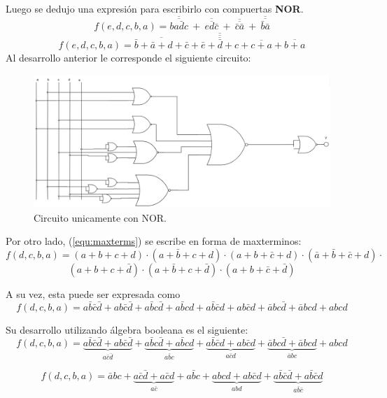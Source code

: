 \documentclass[a4paper]{article}
\begin{document}
\begin{center}
Luego se dedujo una expresión para escribirlo con compuertas \textbf{NOR}.
\[
	f \left( e,d,c,b,a \right) = \overline{\overline{b a \bar{d} c }} \ + \  \overline{\overline{ e d \bar{c}}} \ + \ \overline{\overline{\bar{c} \bar{a}}} \ + \ \overline{\overline{ \bar{b} \bar{a}}}
\]
\[
	f \left( e,d,c,b,a \right) =\overline{\overline{\overline{\bar{b}+\bar{a}+d+\bar{c}}+\overline{\bar{e}+\bar{d}+c}+\overline{c+a}+\overline{b+a}}}
\]
Al desarrollo anterior le corresponde el siguiente circuito:
\begin{figure}[H]
	\hspace*{-1cm}
	\centering
	\includegraphics[width=1.2\textwidth]{Circuito4.png}
	\caption{Circuito unicamente con NOR.}
	\label{fig:circ4}
\end{figure}

Por otro lado, (\ref{equ:maxterms}) se escribe en forma de maxterminos:
\[
	f \left( d,c,b,a \right) = \left( a + b + c + d \right) \cdot \left( a + \bar{b} + c + d\right) \cdot \left( a + b+ \bar{c} + d \right) \cdot \left( \bar{a} + \bar{b} + \bar{c} + d \right) \cdot
\]
\[
	\left( a + b + c + \bar{d} \right) \cdot \left( a + \bar{b} + c + \bar{d} \right) \cdot \left( a + b + \bar{c} +\bar{d} \right)
\]

A su vez, esta puede ser expresada como
\[
	f \left( d,c,b,a \right) = a\bar{b}\bar{c}\bar{d} + ab\bar{c}\bar{d} +
	a\bar{b}c\bar{d} + a\bar{b}cd + a\bar{b}\bar{c}d + ab\bar{c}d + \bar{a}bc\bar{d} + \bar{a}bcd + abcd
\]

Su desarrollo utilizando álgebra booleana es el siguiente:
\[
	f \left( d,c,b,a \right) = \underbrace{a\bar{b}\bar{c}\bar{d} + ab\bar{c}\bar{d}}_{a\bar{c}\bar{d}} +
	\underbrace{a\bar{b}c\bar{d} + a\bar{b}cd}_{a\bar{b}c} + \underbrace{a\bar{b}\bar{c}d + ab\bar{c}d}_{a\bar{c}d} + \underbrace{\bar{a}bc\bar{d} + \bar{a}bcd}_{\bar{a}bc} + abcd
\]

\[
	f \left( d,c,b,a \right) = \bar{a}bc + \underbrace{a\bar{c}\bar{d} + a\bar{c}d}_{a\bar{c}} + a\bar{b}c + \underbrace{abcd + ab\bar{c}d}_{abd} + \underbrace{a\bar{b}\bar{c}\bar{d} + a\bar{b}\bar{c}d}_{a\bar{b}\bar{c}} 
\]


\end{center}
\end{document}
